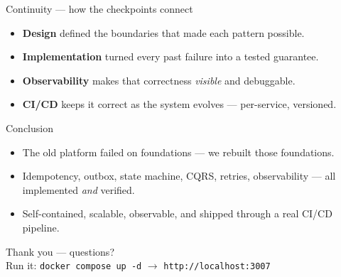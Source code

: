 \documentclass[aspectratio=169]{beamer}
\begin{document}
\begin{frame}{Continuity --- how the checkpoints connect}
  \begin{center}
  \end{center}
  \begin{itemize}\small
    \item \textbf{Design} defined the boundaries that made each pattern possible.
    \item \textbf{Implementation} turned every past failure into a tested guarantee.
    \item \textbf{Observability} makes that correctness \emph{visible} and debuggable.
    \item \textbf{CI/CD} keeps it correct as the system evolves --- per-service, versioned.
  \end{itemize}
\end{frame}

\begin{frame}{Conclusion}
  \begin{itemize}
    \item The old platform failed on foundations --- we rebuilt those foundations.
    \item Idempotency, outbox, state machine, CQRS, retries, observability --- all implemented \emph{and} verified.
    \item Self-contained, scalable, observable, and shipped through a real CI/CD pipeline.
  \end{itemize}
  \vfill
  \begin{center}
    \Large\textcolor{brandblue}{Thank you --- questions?}\\[0.4em]
    \small Run it: \texttt{docker compose up -d} $\rightarrow$ \texttt{http://localhost:3007}
  \end{center}
\end{frame}
\end{document}
